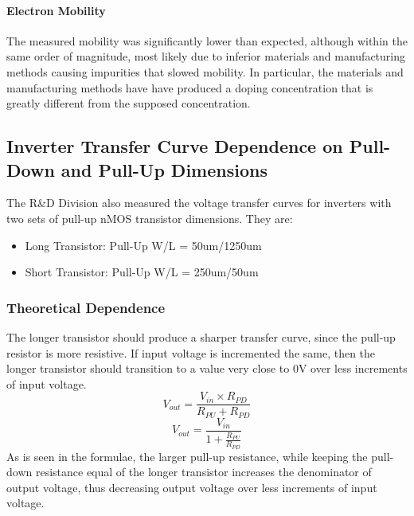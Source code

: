 \documentclass[12pt]{article}
\begin{document}
\paragraph{Electron Mobility}
The measured mobility was significantly lower than expected, although within the same order of magnitude, most likely due to inferior materials and manufacturing methods causing impurities that slowed mobility. In particular, the materials and manufacturing methods have have produced a doping concentration that is greatly different from the supposed concentration.


\subsection{Inverter Transfer Curve Dependence on Pull-Down and Pull-Up Dimensions}
The R\&D Division also measured the voltage transfer curves for inverters with two sets of pull-up nMOS transistor dimensions. They are:
\begin{itemize}
    \item Long Transistor: Pull-Up W/L = 50um/1250um
    \item Short Transistor: Pull-Up W/L = 250um/50um
\end{itemize}

\subsubsection{Theoretical Dependence}
The longer transistor should produce a sharper transfer curve, since the pull-up resistor is more resistive. If input voltage is incremented the same, then the longer transistor should transition to a value very close to 0V over less increments of input voltage.
\[ V_{out} = \frac{V_{in} \times R_{PD}}{R_{PU} + R_{PD}} \]
\[ V_{out} = \frac{V_{in}}{1 + \frac{R_{PU}}{R_{PD}}} \]
As is seen in the formulae, the larger pull-up resistance, while keeping the pull-down resistance equal of the longer transistor increases the denominator of output voltage, thus decreasing output voltage over less increments of input voltage.
\end{document}
